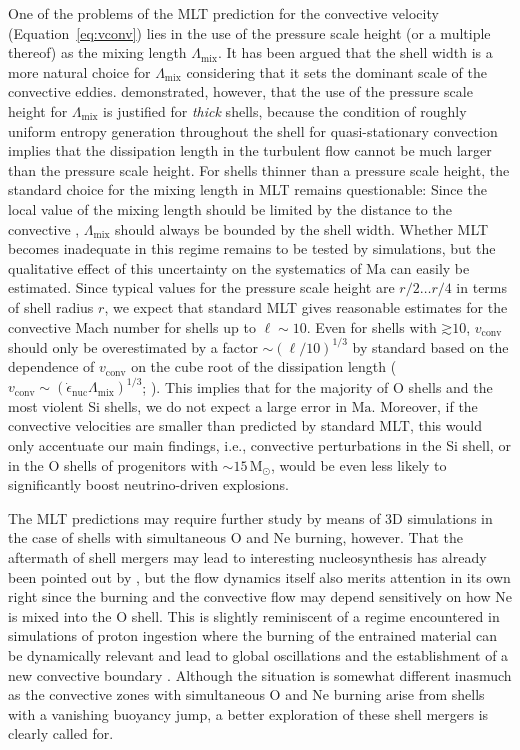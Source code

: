 \documentclass[useAMS,usenatbib]{mnras}
\newcommand{\Msun}{\ensuremath{\mathrm{M}_\odot}}
\begin{document}
One of the problems of the MLT prediction for the convective velocity
(Equation~\ref{eq:vconv}) lies in the use of the pressure scale
height (or a multiple thereof) as the mixing length
$\Lambda_\mathrm{mix}$.  It has been argued \citep{arnett_09} that the shell
width is a more natural choice for $\Lambda_\mathrm{mix}$ considering
that it sets the dominant scale of the convective
eddies. \citet{mueller_16c} demonstrated, however, that the use of the
pressure scale height for $\Lambda_\mathrm{mix}$ is justified for
\emph{thick} shells, because the condition of roughly uniform entropy
generation throughout the shell for quasi-stationary convection
implies that the dissipation length in the turbulent flow cannot be
much larger than the pressure scale height.  For shells thinner than a
pressure scale height, the standard choice for the mixing length in
MLT remains questionable: Since the
local value of the mixing length should be limited by
the distance to the convective \citep{boehm_67,stothers_97},
$\Lambda_\mathrm{mix}$ should always be bounded by the shell width.
Whether MLT becomes inadequate in this regime remains to be tested by
simulations, but the qualitative effect of this uncertainty on the
systematics of $\mathrm{Ma}$ can easily be estimated. Since typical
values for the pressure scale height are $r/2\ldots r/4$ in terms of
shell radius $r$, we expect that standard MLT gives reasonable
estimates for the convective Mach number for shells up to $\ell \sim
10$. Even for shells with $\mathord{\gtrsim} 10$, $v_\mathrm{conv}$
should only be overestimated by a factor $\sim(\ell/10)^{1/3}$ by
standard based on the dependence of $v_\mathrm{conv}$ on the cube root
of the dissipation length ($v_\mathrm{conv} \sim
(\dot{\epsilon}_\mathrm{nuc} \Lambda_\mathrm{mix})^{1/3}$;
\citealp{arnett_09,mueller_16c,jones_17}).  This implies that for the majority of O
shells and the most violent Si shells, we do not expect a large error
in $\mathrm{Ma}$.  Moreover, if the convective velocities are smaller
than predicted by standard MLT, this would only accentuate our main
findings, i.e., convective perturbations in the Si shell, or in the O
shells of progenitors with $\mathord{\sim}15\,\Msun$, would be even
less likely to significantly boost neutrino-driven explosions.

The MLT predictions may require further study by means of 3D
simulations in the case of shells with simultaneous O and Ne burning,
however.  That the aftermath of shell mergers may lead to
  interesting nucleosynthesis has already been pointed out by
  \citet{ritter_17}, but the flow dynamics itself also merits
  attention in its own right since the burning and the convective
flow may depend sensitively on how Ne is mixed into the O shell.  This
is slightly reminiscent of a regime encountered in simulations of
proton ingestion \citep{stancliffe_11,herwig_11,herwig_14} where the
burning of the entrained material can be dynamically relevant and lead
to global oscillations and the establishment of a new convective
boundary \citep{herwig_14}. Although the situation is somewhat
different inasmuch as the convective zones with simultaneous O and Ne
burning arise from shells with a vanishing buoyancy jump, a better
exploration of these shell mergers is clearly called for.
\end{document}
